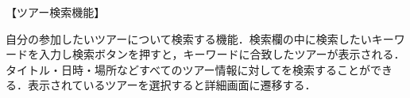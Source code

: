 【ツアー検索機能】
\par 自分の参加したいツアーについて検索する機能．検索欄の中に検索したいキーワードを入力し検索ボタンを押すと，キーワードに合致したツアーが表示される．タイトル・日時・場所などすべてのツアー情報に対してを検索することができる．表示されているツアーを選択すると詳細画面に遷移する．
